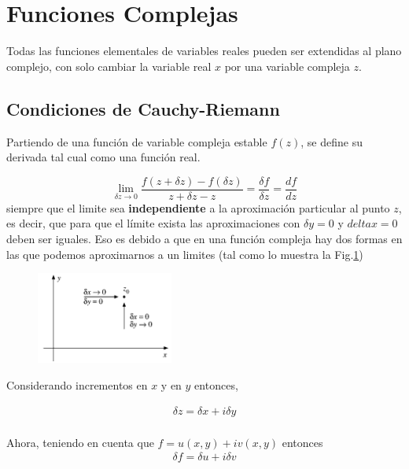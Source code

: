 \section{Funciones Complejas}
    
Todas las funciones elementales de variables reales pueden ser extendidas al plano complejo, con solo cambiar la variable real $x$ por una variable compleja $z$.

\subsection[short]{Condiciones de Cauchy-Riemann}

    Partiendo de una función de variable compleja estable $f(z)$, se define su derivada tal cual como una función real.

    \begin{equation*}
        \lim_{\delta z \rightarrow 0} \frac{f(z + \delta z) - f(\delta z)}{z + \delta z - z} = \frac{\delta f}{\delta z} = \frac{df}{dz}
    \end{equation*}
    siempre que el limite sea \textbf{independiente} a la aproximación particular al punto $z$, es decir, que para que el límite exista las aproximaciones con $\delta y = 0$  y $delta x = 0$  deben ser iguales. Eso es debido a que en una función compleja hay dos formas en las que podemos aproximarnos a un limites (tal como lo muestra la Fig.\ref*{fig:ich})

    \begin{figure}[h]
        \centering
        \includegraphics[width=0.4\textwidth]{imgs/ich.png}
        \caption{}
        \label{fig:ich}
    \end{figure}
    Considerando incrementos en $x$ y en $y$ entonces, 

    \begin{gather*}
        \delta z = \delta x + i\delta y\\
    \end{gather*}

    Ahora, teniendo en cuenta que $f  = u(x,y) + iv(x,y)$ entonces 
    \begin{gather*}
        \delta f = \delta u + i \delta v
    \end{gather*}

